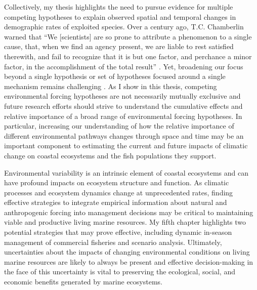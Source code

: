 Collectively, my thesis highlights the need to pursue evidence for multiple
competing hypotheses to explain observed spatial and temporal changes in
demographic rates of exploited species. Over a century ago, T.C. Chamberlin
warned that ``We [scientists] are so prone to attribute a phenomenon to a single
cause, that, when we find an agency present, we are liable to rest satisfied
therewith, and fail to recognize that it is but one factor, and perchance a
minor factor, in the accomplishment of the total result'' \citep{Chamberlin1965}.
Yet, broadening our focus beyond a single hypothesis or set of hypotheses
focused around a single mechanism remains challenging \citep{Hare2014}. As I
show in this thesis, competing environmental forcing hypotheses are not
necessarily mutually exclusive and future research efforts should strive to
understand the cumulative effects and relative importance of a broad range of
environmental forcing hypotheses. In particular, increasing our understanding of
how the relative importance of different environmental pathways changes through
space and time may be an important component to estimating the current and
future impacts of climatic change on coastal ecosystems and the fish populations
they support.

Environmental variability is an intrinsic element of coastal ecosystems and can
have profound impacts on ecosystem structure and function. As climatic processes
and ecosystem dynamics change at unprecedented rates, finding effective
strategies to integrate empirical information about natural and anthropogenic
forcing into management decisions may be critical to maintaining viable and
productive living marine resources. My fifth chapter highlights two potential
strategies that may prove effective, including dynamic in-season management of
commercial fisheries and scenario analysis. Ultimately, uncertainties about the
impacts of changing environmental conditions on living marine resources are
likely to always be present and effective decision-making in the face of this
uncertainty is vital to preserving the ecological, social, and economic benefits
generated by marine ecosystems.


